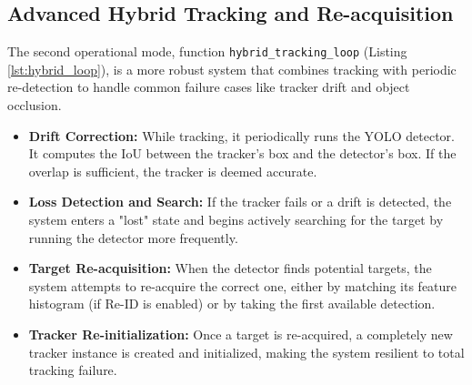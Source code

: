 \documentclass[12pt, a4paper]{article}
\begin{document}
\subsection{Advanced Hybrid Tracking and Re-acquisition}
The second operational mode, function \texttt{hybrid\_tracking\_loop} (Listing \ref{lst:hybrid_loop}), is a more robust system that combines tracking with periodic re-detection to handle common failure cases like tracker drift and object occlusion.
\begin{itemize}
    \item \textbf{Drift Correction:} While tracking, it periodically runs the YOLO detector. It computes the IoU between the tracker's box and the detector's box. If the overlap is sufficient, the tracker is deemed accurate.
    \item \textbf{Loss Detection and Search:} If the tracker fails or a drift is detected, the system enters a "lost" state and begins actively searching for the target by running the detector more frequently.
    \item \textbf{Target Re-acquisition:} When the detector finds potential targets, the system attempts to re-acquire the correct one, either by matching its feature histogram (if Re-ID is enabled) or by taking the first available detection.
    \item \textbf{Tracker Re-initialization:} Once a target is re-acquired, a completely new tracker instance is created and initialized, making the system resilient to total tracking failure.
\end{itemize}
\end{document}
